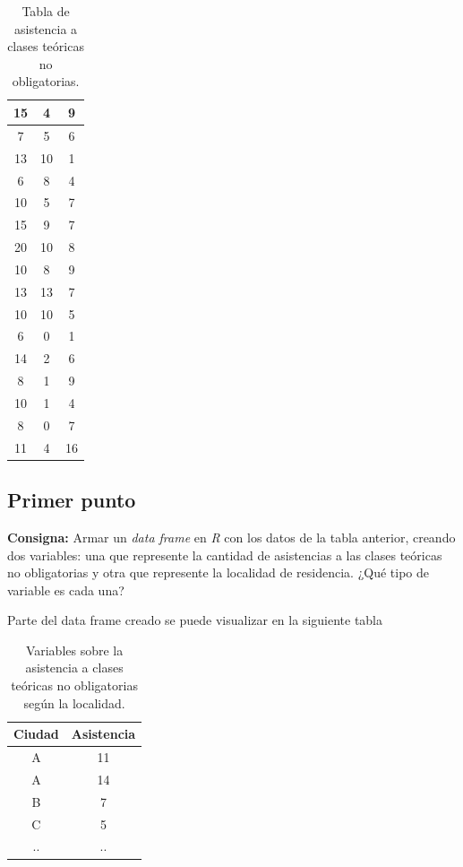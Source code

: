 \documentclass{article} %
\begin{document}
\begin{table}[H]
\begin{tabular}{|| c | c | c ||}
            \hline
            15 & 4 & 9\\
            \hline
            7 & 5 & 6\\
            \hline
            13 & 10 & 1\\
            \hline
            6 & 8 & 4\\
            \hline
            10 & 5 & 7\\
            \hline
            15 & 9 & 7\\
            \hline
            20 & 10 & 8\\
            \hline
            10 & 8 & 9\\
            \hline
            13 & 13 & 7\\
            \hline
            10 & 10 & 5\\
            \hline
            6 & 0 & 1\\
            \hline
            14 & 2 & 6\\
            \hline
            8 & 1 & 9\\
            \hline
            10 & 1 & 4\\
            \hline
            8 & 0 & 7\\
            \hline
            11 & 4 & 16\\
            \hline
			\hline
		\end{tabular}
		\caption{Tabla de asistencia a clases teóricas no obligatorias.}
	\label{tab:tabla-punto-4}
\end{table}

\subsection{Primer punto}

\textbf{Consigna:} Armar un \textit{data frame} en \textit{R} con los datos de la tabla anterior, creando dos variables: una que represente la cantidad de asistencias a las clases teóricas no obligatorias y otra que represente la localidad de residencia. ¿Qué tipo de variable es cada una?

Parte del data frame creado se puede visualizar en la siguiente tabla

\begin{table}[H]
	\centering
		\begin{tabular}{|| c | c ||}
			\hline
			\hline
			Ciudad & Asistencia\\
			\hline
			\hline		
			A & 11\\
			\hline
			A & 14\\
			\hline
			B & 7\\
            \hline
            C & 5\\
            \hline
            .. & ..\\
            \hline
			\hline
		\end{tabular}
		\caption{Variables sobre la asistencia a clases teóricas no obligatorias según la localidad.}
	\label{tab:tabla-punto-4-1}
\end{table}
\end{document}
